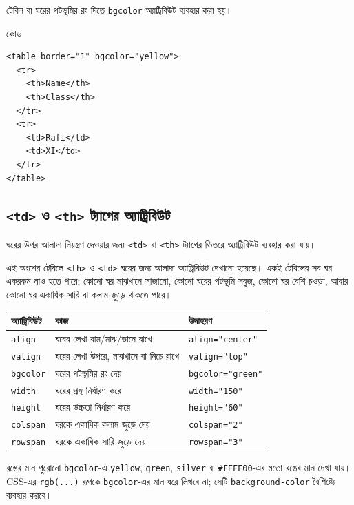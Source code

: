 টেবিল বা ঘরের পটভূমির রং দিতে \texttt{bgcolor} অ্যাট্রিবিউট ব্যবহার করা হয়।

\begin{chFourWholeExample}{কোড}
\begin{verbatim}
<table border="1" bgcolor="yellow">
  <tr>
    <th>Name</th>
    <th>Class</th>
  </tr>
  <tr>
    <td>Rafi</td>
    <td>XI</td>
  </tr>
</table>
\end{verbatim}
\end{chFourWholeExample}

\subsection{\texttt{<td>} ও \texttt{<th>} ট্যাগের অ্যাট্রিবিউট}

ঘরের উপর আলাদা নিয়ন্ত্রণ দেওয়ার জন্য \texttt{<td>} বা \texttt{<th>} ট্যাগের ভিতরে অ্যাট্রিবিউট ব্যবহার করা যায়।

এই অংশের টেবিলে \texttt{<th>} ও \texttt{<td>} ঘরের জন্য আলাদা অ্যাট্রিবিউট দেখানো হয়েছে। একই টেবিলের সব ঘর একরকম নাও হতে পারে; কোনো ঘর মাঝখানে সাজানো, কোনো ঘরের পটভূমি সবুজ, কোনো ঘর বেশি চওড়া, আবার কোনো ঘর একাধিক সারি বা কলাম জুড়ে থাকতে পারে।

\begin{center}
\begin{tabular}{|p{}|p{}|p{}|}
\hline
\textbf{অ্যাট্রিবিউট} & \textbf{কাজ} & \textbf{উদাহরণ} \\
\hline
\texttt{align} & ঘরের লেখা বাম/মাঝ/ডানে রাখে & \texttt{align="center"} \\
\hline
\texttt{valign} & ঘরের লেখা উপরে, মাঝখানে বা নিচে রাখে & \texttt{valign="top"} \\
\hline
\texttt{bgcolor} & ঘরের পটভূমির রং দেয় & \texttt{bgcolor="green"} \\
\hline
\texttt{width} & ঘরের প্রস্থ নির্ধারণ করে & \texttt{width="150"} \\
\hline
\texttt{height} & ঘরের উচ্চতা নির্ধারণ করে & \texttt{height="60"} \\
\hline
\texttt{colspan} & ঘরকে একাধিক কলাম জুড়ে দেয় & \texttt{colspan="2"} \\
\hline
\texttt{rowspan} & ঘরকে একাধিক সারি জুড়ে দেয় & \texttt{rowspan="3"} \\
\hline
\end{tabular}
\end{center}

\begin{keypointbox}{রঙের মান}
পুরোনো \texttt{bgcolor}-এ \texttt{yellow}, \texttt{green}, \texttt{silver} বা \texttt{\#FFFF00}-এর মতো রঙের মান দেখা যায়। CSS-এর \texttt{rgb(...)} রূপকে \texttt{bgcolor}-এর মান ধরে লিখবে না; সেটি \texttt{background-color} বৈশিষ্ট্যে ব্যবহার করবে।
\end{keypointbox}

